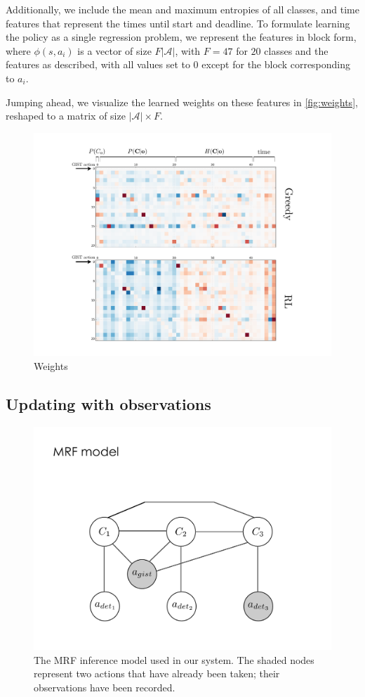 Additionally, we include the mean and maximum entropies of all classes, and time features that represent the times until start and deadline.
To formulate learning the policy as a single regression problem, we represent the features in block form, where $\phi(s,a_i)$ is a vector of size $F|\mathcal{A}|$, with $F=47$ for $20$ classes and the features as described, with all values set to $0$ except for the block corresponding to $a_i$.

Jumping ahead, we visualize the learned weights on these features in \autoref{fig:weights}, reshaped to a matrix of size $|\mathcal{A}| \times F$.

\begin{figure}[h!]
\centering
\includegraphics[width=0.87\linewidth]
    {../figures/weights.pdf}
\caption{Weights }
\label{fig:weights}
\end{figure}

\subsection{Updating with observations} \label{sec:updating}
\begin{figure}[h!]
\centering
\includegraphics[width=0.56\linewidth]{../figures/mrf_w_gist.pdf}
\caption{
The MRF inference model used in our system. The shaded nodes represent two actions that have already been taken; their observations have been recorded.
}
\label{fig:model}
\end{figure}

